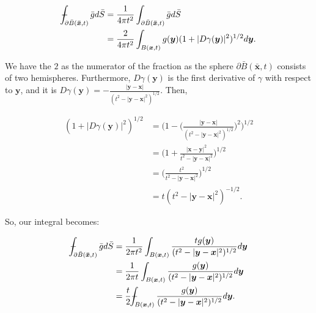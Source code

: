 \documentclass[a4paper, 12pt]{article}
\def\Xint#1{\mathchoice
{\XXint\displaystyle\textstyle{#1}}%
{\XXint\textstyle\scriptstyle{#1}}%
{\XXint\scriptstyle\scriptscriptstyle{#1}}%
{\XXint\scriptscriptstyle\scriptscriptstyle{#1}}%
\!\int}
\def\XXint#1#2#3{{\setbox0=\hbox{$#1{#2#3}{\int}$ }
\vcenter{\hbox{$#2#3$ }}\kern-.6\wd0}}
\def\dashint{\Xint-}
\numberwithin{equation}{section}
\begin{document}
\begin{equation*}
    \begin{aligned}
        \dashint_{\partial \bar{B}(\boldsymbol{\bar{x}}, t)} \bar{g} d\bar{S}&=\frac{1}{4\pi t^2}\int_{\partial \bar{B}(\boldsymbol{\bar{x}}, t)}\bar{g} d\bar{S}\\
        &=\frac{2}{4 \pi t^2} \int_{B(\boldsymbol{x}, t)} g(\boldsymbol{y})(1+|D\gamma (\boldsymbol{y})|^2)^{1/2}d\boldsymbol{y}.
    \end{aligned}
\end{equation*}

We have the $2$ as the numerator of the fraction as the sphere $\partial\bar{B}(\boldsymbol{\bar{x}}, t)$ consists of two hemispheres. Furthermore, $D\gamma (\boldsymbol{y})$ is the first derivative of $\gamma$ with respect to $\boldsymbol{y}$, and it is
$D\gamma (\boldsymbol{y})=-\frac{|\boldsymbol{y}-\boldsymbol{x}|}{(t^2-|\boldsymbol{y}-\boldsymbol{x}|^2)^{1/2}}$. Then,

\begin{equation*}
    \begin{aligned}
        (1+|D\gamma (\boldsymbol{y})|^2)^{1/2}&=\Big(1-\Big(\frac{|\boldsymbol{y}-\boldsymbol{x}|}{(t^2-|\boldsymbol{y}-\boldsymbol{x}|^2)^{1/2}}\Big)^2\Big)^{1/2}\\
        &=\Big(1+\frac{|\boldsymbol{x}-\boldsymbol{y}|^2}{t^2-|\boldsymbol{y}-\boldsymbol{x}|^2}\Big)^{1/2}\\
        &=\Big(\frac{t^2}{t^2-|\boldsymbol{y}-\boldsymbol{x}|^2}\Big)^{1/2}\\
        &=t(t^2-|\boldsymbol{y}-\boldsymbol{x}|^2)^{-1/2}.
    \end{aligned}
\end{equation*}

So, our integral becomes:

\begin{equation*}
    \begin{aligned}
        \dashint_{\partial \bar{B}(\boldsymbol{\bar{x}}, t)} \bar{g} d\bar{S}&=\frac{1}{2 \pi t^2}\int_{B(\boldsymbol{x},t)}\frac{tg(\boldsymbol{y})}{(t^2-|\boldsymbol{y}-\boldsymbol{x}|^2)^{1/2}}d\boldsymbol{y}\\
        &=\frac{1}{2 \pi t}\int_{B(\boldsymbol{x},t)}\frac{g(\boldsymbol{y})}{(t^2-|\boldsymbol{y}-\boldsymbol{x}|^2)^{1/2}}d\boldsymbol{y}\\
        &=\frac{t}{2}\dashint_{B(\boldsymbol{x},t)}\frac{g(\boldsymbol{y})}{(t^2-|\boldsymbol{y}-\boldsymbol{x}|^2)^{1/2}}d\boldsymbol{y}.
    \end{aligned}
\end{equation*}
\end{document}
